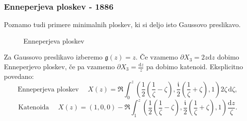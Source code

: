 \documentclass[8pt]{beamer}
\newcommand{\samplescalar}{50} %
\theoremstyle{definition}
\theoremstyle{remark}
\theoremstyle{plain}
\numberwithin{equation}{section}  %
\begin{document}
\begin{frame}
    \frametitle{Enneperjeva ploskev - 1886}
    
    Poznamo tudi primere minimalnih ploskev, ki si deljo isto Gaussovo preslikavo. 

    \begin{figure}[H]
        \centering

        \caption{Enneperjeva ploskev}
    \end{figure}
    \pause 
    Za Gaussovo preslikavo izberemo $\mathfrak{g}(z)=z$. Če vzamemo $\partial X_3=2 z \mathrm{d} z$ dobimo Enneperjevo ploskev, če pa vzamemo $\partial X_3=\frac{\mathrm{d} z}{z}$ pa dobimo katenoid. Eksplicitno povedano: 
    \begin{equation*}
        \text { Enneperjeva ploskev } \quad X(z)=\Re \int_0^z\left(\frac{1}{2}\left(\frac{1}{\zeta}-\zeta\right), \frac{\mathfrak{i}}{2}\left(\frac{1}{\zeta}+\zeta\right), 1\right) 2 \zeta \, \mathrm{d} \zeta,
    \end{equation*}  
    \begin{equation*}
        \text { Katenoida } \quad X(z)=(1,0,0)-\Re \int_1^z\left(\frac{1}{2}\left(\frac{1}{\zeta} - \zeta\right), \frac{\mathfrak{i}}{2}\left(\frac{1}{\zeta}+\zeta\right), 1\right) \frac{\mathrm{d} z}{\zeta} .
    \end{equation*}
\end{frame}
\end{document}
